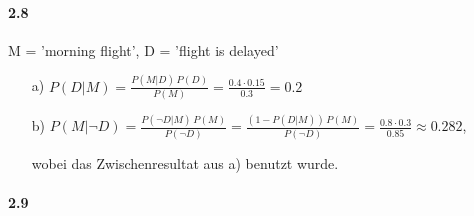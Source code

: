 \documentclass[fontsize=11pt,DIV=18,parskip=half]{scrartcl}
\begin{document}
\paragraph{2.8} M = 'morning flight', D = 'flight is delayed'
\begin{enumerate}
\item[a)] $P(D|M) = \frac{P(M|D) \, P(D)}{P(M)} = \frac{0.4 \cdot 0.15}{0.3} = 0.2$
\item[b)] $P(M|\neg D) = \frac{P(\neg D|M) \, P(M)}{P(\neg D)} = \frac{(1-P(D|M)) \, P(M)}{P(\neg D)} = \frac{0.8 \cdot 0.3}{0.85} \approx 0.282$,

wobei das Zwischenresultat aus a) benutzt wurde.
\end{enumerate}

\paragraph{2.9}
\end{document}
